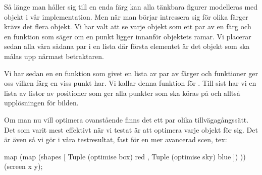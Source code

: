 \documentclass[Rapport]{subfiles}
\begin{document}


Så länge man håller sig till en enda färg kan alla tänkbara figurer modelleras
med objekt i vår implementation. Men när man börjar intressera sig för olika färger krävs det
flera objekt. Vi har valt att se varje objekt som ett par
av en färg och en funktion som säger om en punkt ligger innanför objektets ramar. 
Vi placerar sedan alla våra sådana par i en lista där första elementet är det
objekt som ska målas upp närmast betraktaren. 

Vi har sedan en en funktion som givet en lista av par av färger och funktioner
ger oss vilken färg en viss punkt har. Vi kallar denna funktion för
. Till sist har vi en lista av listor av positioner som ger alla
punkter som  ska köras på och alltså upplösningen för bilden.


Om man nu vill optimera ovanstående finns det ett par olika tillvägagångssätt. Det som varit mest effektivt när vi testat är att optimera varje objekt för sig. Det är även så vi gör i våra testresultat, fast för en mer avancerad scen, tex: 
\begin{codeEx}
map (map (shapes 
             [ Tuple (optimise box) red
             , Tuple (optimise sky) blue 
             ])
         )) (screen x y);
\end{codeEx}
\end{document}
